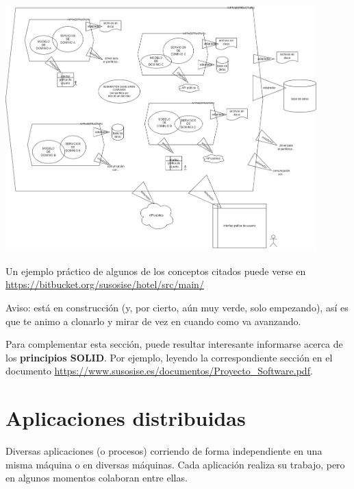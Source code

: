 \documentclass[spanish,12pt,a4paper,final,oneside]{book}
\begin{document}
\begin{center}\includegraphics[width=0.9\textwidth]{division en capas - DDD}\end{center}


\begin{footnotesize}
Un ejemplo práctico de algunos de los conceptos citados puede verse en
\\\url{https://bitbucket.org/susosise/hotel/src/main/}
\end{footnotesize}
\begin{scriptsize}
Aviso: está en construcción (y, por cierto, aún muy verde, solo empezando), así es que te animo a clonarlo y mirar de vez en cuando como va avanzando.
\end{scriptsize}

\begin{footnotesize}
Para complementar esta sección, puede resultar interesante informarse acerca de los \textbf{principios SOLID}. Por ejemplo, leyendo la correspondiente sección en el documento \url{https://www.susosise.es/documentos/Proyecto_Software.pdf}.
\end{footnotesize}


\section{Aplicaciones distribuidas} \label{AplicacionesDistribuidas}
Diversas aplicaciones (o procesos) corriendo de forma independiente en una misma máquina o en diversas máquinas. Cada aplicación realiza su trabajo, pero en algunos momentos colaboran entre ellas.
\end{document}
